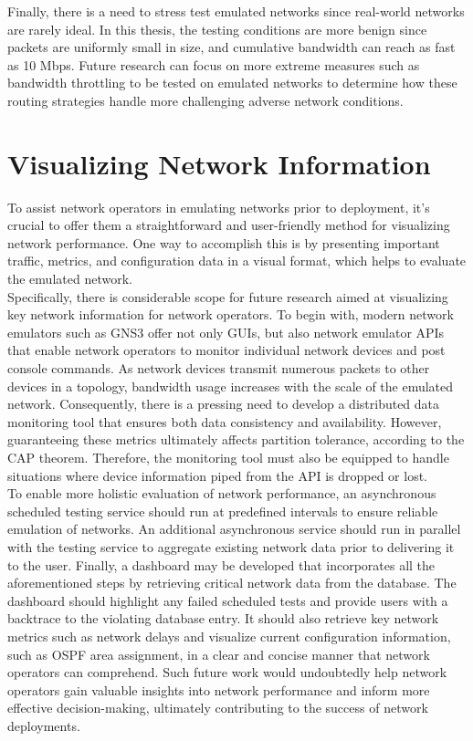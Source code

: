 \documentclass{uiucthesis2021}
\begin{document}
\noindent Finally, there is a need to stress test emulated networks since real-world networks are rarely ideal. In this thesis, the testing conditions are more benign since packets are uniformly small in size, and cumulative bandwidth can reach as fast as 10 Mbps. Future research can focus on more extreme measures such as bandwidth throttling to be tested on emulated networks to determine how these routing strategies handle more challenging adverse network conditions. 

\section{Visualizing Network Information}
\noindent To assist network operators in emulating networks prior to deployment, it's crucial to offer them a straightforward and user-friendly method for visualizing network performance. One way to accomplish this is by presenting important traffic, metrics, and configuration data in a visual format, which helps to evaluate the emulated network. \\

\noindent Specifically, there is considerable scope for future research aimed at visualizing key network information for network operators. To begin with, modern network emulators such as GNS3 offer not only GUIs, but also network emulator APIs that enable network operators to monitor individual network devices and post console commands. As network devices transmit numerous packets to other devices in a topology, bandwidth usage increases with the scale of the emulated network. Consequently, there is a pressing need to develop a distributed data monitoring tool that ensures both data consistency and availability. However, guaranteeing these metrics ultimately affects partition tolerance, according to the CAP theorem. Therefore, the monitoring tool must also be equipped to handle situations where device information piped from the API is dropped or lost. \\

\noindent To enable more holistic evaluation of network performance, an asynchronous scheduled testing service should run at predefined intervals to ensure reliable emulation of networks. An additional asynchronous service should run in parallel with the testing service to aggregate existing network data prior to delivering it to the user. Finally, a dashboard may be developed that incorporates all the aforementioned steps by retrieving critical network data from the database. The dashboard should highlight any failed scheduled tests and provide users with a backtrace to the violating database entry. It should also retrieve key network metrics such as network delays and visualize current configuration information, such as OSPF area assignment, in a clear and concise manner that network operators can comprehend. Such future work would undoubtedly help network operators gain valuable insights into network performance and inform more effective decision-making, ultimately contributing to the success of network deployments.
\end{document}

